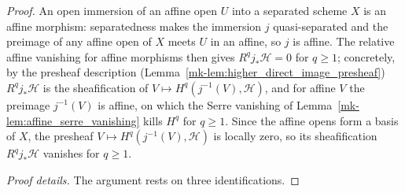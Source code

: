 \begin{proof}
  An open immersion of an affine open \(U\) into a separated scheme \(X\) is an
  affine morphism: separatedness makes the immersion \(j\) quasi-separated and the
  preimage of any affine open of \(X\) meets \(U\) in an affine, so \(j\) is affine.
  The relative affine vanishing for affine morphisms then gives \(R^q j_*\mathcal{H} =
  0\) for \(q \geq 1\); concretely, by the presheaf description
  (Lemma~\ref{mk-lem:higher_direct_image_presheaf}) \(R^q j_*\mathcal{H}\) is the
  sheafification of \(V \mapsto H^q(j^{-1}(V), \mathcal{H})\), and for affine \(V\) the
  preimage \(j^{-1}(V)\) is affine, on which the Serre vanishing of
  Lemma~\ref{mk-lem:affine_serre_vanishing} kills \(H^q\) for \(q \geq 1\). Since the affine
  opens form a basis of \(X\), the presheaf \(V \mapsto H^q(j^{-1}(V), \mathcal{H})\) is
  locally zero, so its sheafification \(R^q j_*\mathcal{H}\) vanishes for \(q \geq 1\).

  \emph{Proof details.} The argument rests on three identifications.


\end{proof}
